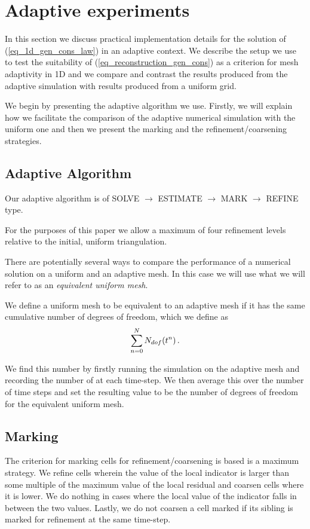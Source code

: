 \documentclass[final]{amsart}
\numberwithin{equation}{section}
\begin{document}
\section{Adaptive experiments}\label{sec:adaptive_implementation}
In  this section we discuss practical implementation details for the solution of (\ref{eq_1d_gen_cons_law}) in an adaptive context.   We describe the setup we use to test the suitability of (\ref{eq_reconstruction_gen_cons}) as a criterion for mesh adaptivity in 1D and we compare and contrast the results produced from the adaptive simulation with results produced from a uniform grid.

We begin by  presenting the adaptive algorithm we use.  Firstly, we will explain how we facilitate the comparison of the adaptive numerical simulation with the uniform one and then we present the  marking and the refinement/coarsening strategies.

\subsection{Adaptive Algorithm}
Our adaptive algorithm is of SOLVE $\to$ ESTIMATE $\to$ MARK $\to$ REFINE type.

\begin{Rem}
For the purposes of this paper we allow a maximum of  four  refinement levels relative to the initial, uniform triangulation. 
\end{Rem}
There are potentially several ways to compare the performance of a numerical solution on a uniform and an adaptive mesh.  In this case we will use what we will refer to as an \textit{equivalent uniform mesh}.
\begin{Defn}  \label{defn:equiv_uniform_mesh} We define a uniform mesh to be equivalent to an adaptive mesh if it has the same cumulative number of degrees of freedom, which we define as
	\begin{equation}
\sum_{n=0}^{N}N_{dof}\!\left({t^n}\right).
	\end{equation}
\end{Defn}
 We find this number by firstly running the simulation on the adaptive mesh and recording the number of  at each time-step.  We then average this over the number of time steps and set the resulting value to be the number of degrees of freedom for the equivalent uniform mesh.

\subsection{Marking}
The criterion for marking cells for refinement/coarsening is based is a maximum strategy.  We refine cells wherein  the value of the local indicator is larger than some multiple of the maximum value of the local residual and coarsen cells where it is lower.  We  do nothing in cases where the local value of the indicator falls in between the two values.  Lastly, we do not coarsen a cell marked if its sibling is marked for   refinement at the same time-step.
\end{document}
